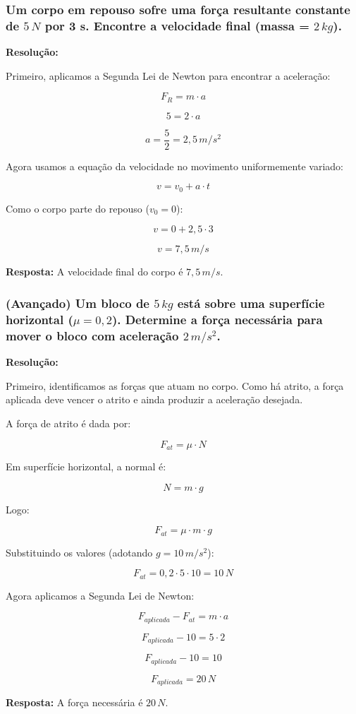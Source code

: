 \documentclass[a4paper,12pt]{article}
\begin{document}
\newpage

\subsubsection{Um corpo em repouso sofre uma força resultante constante de $5\,N$ por 3 s. Encontre a velocidade final (massa = $2\,kg$).}

{\color{blue}
\textbf{Resolução:}

Primeiro, aplicamos a Segunda Lei de Newton para encontrar a aceleração:

\[
F_R = m \cdot a
\]

\[
5 = 2 \cdot a
\]

\[
a = \frac{5}{2} = 2{,}5\,m/s^2
\]

Agora usamos a equação da velocidade no movimento uniformemente variado:

\[
v = v_0 + a \cdot t
\]

Como o corpo parte do repouso ($v_0 = 0$):

\[
v = 0 + 2{,}5 \cdot 3
\]

\[
v = 7{,}5\,m/s
\]

\textbf{Resposta:} A velocidade final do corpo é $7{,}5\,m/s$.
}

\newpage

\subsubsection{(Avançado) Um bloco de $5\,kg$ está sobre uma superfície horizontal ($\mu=0{,}2$). Determine a força necessária para mover o bloco com aceleração $2\,m/s^2$.}

{\color{blue}
\textbf{Resolução:}

Primeiro, identificamos as forças que atuam no corpo. Como há atrito, a força aplicada deve vencer o atrito e ainda produzir a aceleração desejada.

A força de atrito é dada por:

\[
F_{at} = \mu \cdot N
\]

Em superfície horizontal, a normal é:

\[
N = m \cdot g
\]

Logo:

\[
F_{at} = \mu \cdot m \cdot g
\]

Substituindo os valores (adotando $g = 10\,m/s^2$):

\[
F_{at} = 0{,}2 \cdot 5 \cdot 10 = 10\,N
\]

Agora aplicamos a Segunda Lei de Newton:

\[
F_{aplicada} - F_{at} = m \cdot a
\]

\[
F_{aplicada} - 10 = 5 \cdot 2
\]

\[
F_{aplicada} - 10 = 10
\]

\[
F_{aplicada} = 20\,N
\]

\textbf{Resposta:} A força necessária é $20\,N$.
}
\end{document}
